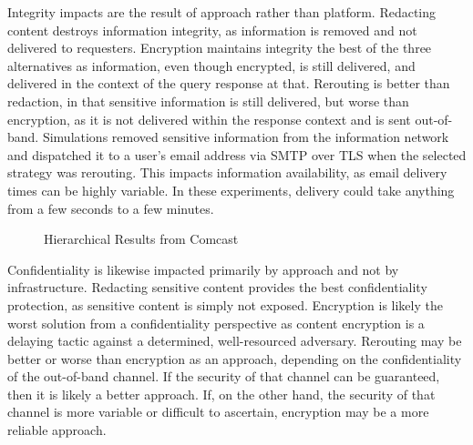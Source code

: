 Integrity impacts are the result of approach rather than platform.  Redacting content destroys information integrity, as information is removed and not delivered to requesters.  Encryption maintains integrity the best of the three alternatives as information, even though encrypted, is still delivered, and delivered in the context of the query response at that.  Rerouting is better than redaction, in that sensitive information is still delivered, but worse than encryption, as it is not delivered within the response context and is sent out-of-band. Simulations removed sensitive information from the information network and dispatched it to a user's email address via SMTP over TLS when the selected strategy was rerouting.  This impacts information availability, as email delivery times can be highly variable.  In these experiments, delivery could take anything from a few seconds to a few minutes.


\begin{figure}[htbp]
\begin{minipage}[b]{0.5\linewidth}
\centering
{}
\end{minipage}
\begin{minipage}[b]{0.5\linewidth}
\centering
{}
\end{minipage}
\caption{Hierarchical Results from Comcast}
\label{fig:model:comcast-results}
\end{figure}

Confidentiality is likewise impacted primarily by approach and not by infrastructure.  Redacting sensitive content provides the best confidentiality protection, as sensitive content is simply not exposed.  Encryption is likely the worst solution from a confidentiality perspective as content encryption is a delaying tactic against a determined, well-resourced adversary.  Rerouting may be better or worse than encryption as an approach, depending on the confidentiality of the out-of-band channel.  If the security of that channel can be guaranteed, then it is likely a better approach.  If, on the other hand, the security of that channel is more variable or difficult to ascertain, encryption may be a more reliable approach.

